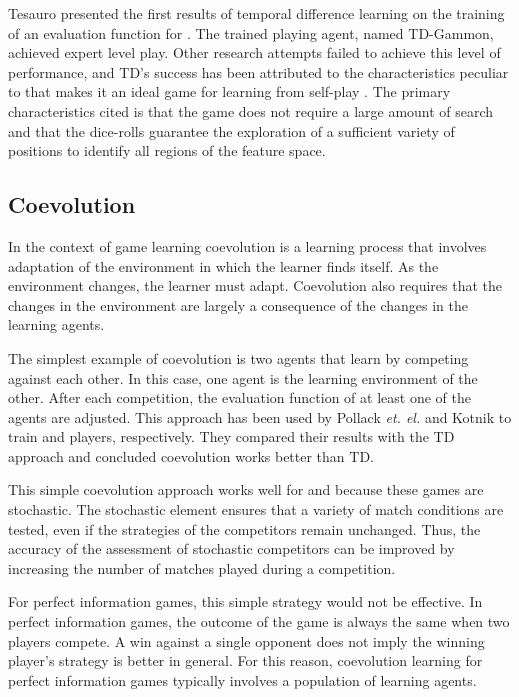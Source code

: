 Tesauro \cite{tesauro:practical,tesauro:learning} presented the first results of temporal difference learning on the training of an evaluation function for . The trained playing agent, named TD-Gammon, achieved expert level play.
Other research attempts failed to achieve this level of performance, and TD's success has been attributed to the characteristics peculiar to  that makes it an ideal game for learning from self-play \cite{furnkranz:survey,pollack:player,kotnik:significance}. The primary characteristics cited is that the game does not require a large amount of search and that the dice-rolls guarantee the exploration of a sufficient variety of positions to identify all regions of the feature space.  

\subsection{Coevolution} 
\label{sec:learning-coevolution}
In the context of game learning coevolution is a learning process that involves adaptation of the environment in which the learner finds itself.  As the environment changes, the learner must adapt.  Coevolution also requires that the changes in the environment are largely a consequence of the changes in the learning agents. 

The simplest example of coevolution is two agents that learn by competing against each other.  In this case, one agent is the learning environment of the other. After each competition, the evaluation function of at least one of the agents are adjusted. This approach has been used by Pollack {\it et. el.} \cite{pollack:player} and Kotnik \cite{kotnik:significance} to train  and  players, respectively.  They compared their results with the TD approach and concluded coevolution works better than TD.  

This simple coevolution approach works well for  and  because these games are stochastic. The stochastic element ensures that a variety of match conditions are tested, even if the strategies of the competitors remain unchanged.  Thus, the accuracy of the assessment of stochastic competitors can be improved by increasing the number of matches played during a competition.  

For perfect information games, this simple strategy would not be effective.  In perfect information games, the outcome of the game is always the same when two players compete.  A win against a single opponent does not imply the winning player's strategy is better in general.  For this reason, coevolution learning for perfect information games typically involves a population of learning agents. 

